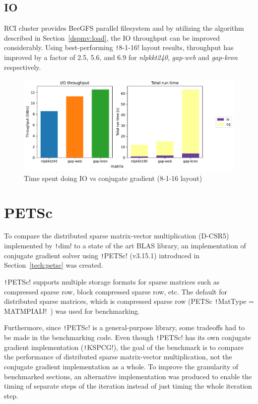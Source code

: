 \documentclass[thesis=M,english]{FITthesis}[2019/12/23]
\newcommand{\csre}[1]{\texttt!#1!}
\begin{document}
\subsection{IO}

RCI cluster provides BeeGFS parallel filesystem and by utilizing the algorithm described in
Section~\ref{dspmv:load}, the IO throughput can be improved considerably. Using best-performing \csre{8-1-16}
layout results, throughput has improved by a factor of 2.5, 5.6, and 6.9 for \textit{nlpkkt240}, \textit{gap-web}
and \textit{gap-kron} respectively.

\begin{figure}[htp]
    \centering
    \includegraphics[scale=0.58]{static/io_mp.pdf}
    \caption{Time spent doing IO vs conjugate gradient (8-1-16 layout)}
\end{figure}

\section{PETSc}

To compare the distributed sparse matrix-vector multiplication (D-CSR5) implemented by \csre{dim}
to a state of the art BLAS library, an
implementation of conjugate gradient solver using \csre{PETSc} (v3.15.1) introduced in
Section~\ref{tech:petsc} was created.

\csre{PETSc} supports
multiple storage formats for sparse matrices such as compressed sparse row, block compressed
sparse row, etc. The default for distributed sparse matrices, which is compressed sparse row
(PETSc \csre{MatType = MATMPIAIJ}~\cite{petsc-user-ref}) was used for benchmarking.

Furthermore, since \csre{PETSc} is a general-purpose library, some tradeoffs had to be made
in the benchmarking code. Even though \csre{PETSc} has its own conjugate gradient implementation
(\csre{KSPCG}),
the goal of the benchmark is to compare the performance of distributed sparse matrix-vector
multiplication, not the conjugate gradient implementation as a whole. To improve the granularity
of benchmarked sections, an alternative
implementation was produced to enable the timing of separate steps of the iteration instead of just
timing the whole iteration step.
\end{document}
